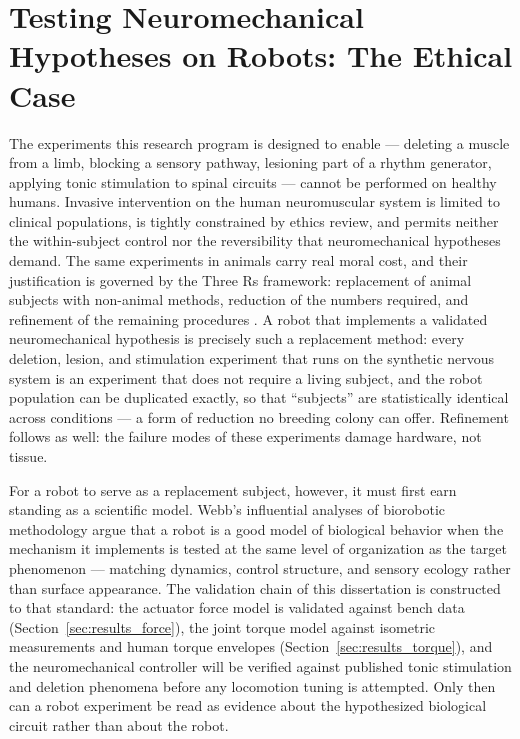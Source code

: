 \section{Testing Neuromechanical Hypotheses on Robots: The Ethical Case}\label{sec:bg_ethics}

The experiments this research program is designed to enable --- deleting a muscle from a limb, blocking a sensory pathway, lesioning part of a rhythm generator, applying tonic stimulation to spinal circuits --- cannot be performed on healthy humans. Invasive intervention on the human neuromuscular system is limited to clinical populations, is tightly constrained by ethics review, and permits neither the within-subject control nor the reversibility that neuromechanical hypotheses demand. The same experiments in animals carry real moral cost, and their justification is governed by the Three Rs framework: replacement of animal subjects with non-animal methods, reduction of the numbers required, and refinement of the remaining procedures \citep{russell_principles_1959, tannenbaum_russell_2015}. A robot that implements a validated neuromechanical hypothesis is precisely such a replacement method: every deletion, lesion, and stimulation experiment that runs on the synthetic nervous system is an experiment that does not require a living subject, and the robot population can be duplicated exactly, so that ``subjects'' are statistically identical across conditions --- a form of reduction no breeding colony can offer. Refinement follows as well: the failure modes of these experiments damage hardware, not tissue.

For a robot to serve as a replacement subject, however, it must first earn standing as a scientific model. Webb's influential analyses of biorobotic methodology \citep{webb_robots_2001, webb_robots_2002} argue that a robot is a good model of biological behavior when the mechanism it implements is tested at the same level of organization as the target phenomenon --- matching dynamics, control structure, and sensory ecology rather than surface appearance. The validation chain of this dissertation is constructed to that standard: the actuator force model is validated against bench data (Section~\ref{sec:results_force}), the joint torque model against isometric measurements and human torque envelopes (Section~\ref{sec:results_torque}), and the neuromechanical controller will be verified against published tonic stimulation and deletion phenomena \citep{selionov_tonic_2009, rybak_modelling_2006} before any locomotion tuning is attempted. Only then can a robot experiment be read as evidence about the hypothesized biological circuit rather than about the robot.

